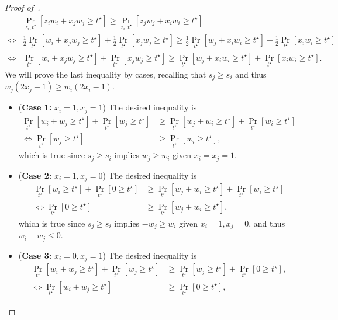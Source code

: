 \begin{proof}[Proof of~]
    \begin{align*}
        &\Pr_{z_i, t^\star}[z_i w_i + x_j w_j \geq t^\star] \geq \Pr_{z_i, t^\star}[z_j w_j + x_i w_i \geq t^\star] \\
        \iff& \frac{1}{2}\Pr_{t^\star}[w_i + x_j w_j \geq t^\star] + \frac{1}{2}\Pr_{t^\star}[x_j w_j \geq t^\star] \geq \frac{1}{2}\Pr_{t^\star}[w_j + x_i w_i \geq t^\star] + \frac{1}{2}\Pr_{t^\star}[x_i w_i \geq t^\star] \\
        \iff& \Pr_{t^\star}[w_i + x_j w_j \geq t^\star] + \Pr_{t^\star}[x_j w_j \geq t^\star] \geq \Pr_{t^\star}[w_j + x_i w_i \geq t^\star] + \Pr_{t^\star}[x_i w_i \geq t^\star].
    \end{align*}
    We will prove the last inequality by cases, recalling that $s_j \geq s_i$ and thus $w_j (2x_j - 1) \geq w_i (2x_i - 1)$.
    \begin{itemize}
        \item (\textbf{Case 1:} $x_i = 1, x_j = 1$) The desired inequality is
        \begin{align*}
            \Pr_{t^\star}[w_i + w_j \geq t^\star] + \Pr_{t^\star}[w_j \geq t^\star] &\geq \Pr_{t^\star}[w_j + w_i \geq t^\star] + \Pr_{t^\star}[w_i \geq t^\star]\\
            \iff \Pr_{t^\star}[w_j \geq t^\star] &\geq \Pr_{t^\star}[w_i \geq t^\star],
        \end{align*}
        which is true since $s_j \geq s_i$ implies $w_j \geq w_i$ given $x_i = x_j = 1$.
        \item (\textbf{Case 2:} $x_i = 1, x_j = 0$) The desired inequality is
        \begin{align*}
            \Pr_{t^\star}[w_i \geq t^\star] + \Pr_{t^\star}[0\geq t^\star] &\geq \Pr_{t^\star}[w_j + w_i \geq t^\star] + \Pr_{t^\star}[w_i \geq t^\star]\\
            \iff \Pr_{t^\star}[0 \geq t^\star] &\geq \Pr_{t^\star}[w_j + w_i \geq t^\star],
        \end{align*}
        which is true since $s_j \geq s_i$ implies $-w_j \geq w_i$ given $x_i = 1, x_j = 0$, and thus $w_i + w_j \leq 0$.
        \item (\textbf{Case 3:} $x_i = 0, x_j = 1$) The desired inequality is 
        \begin{align*}
            \Pr_{t^\star}[w_i + w_j \geq t^\star] + \Pr_{t^\star}[w_j \geq t^\star] &\geq \Pr_{t^\star}[w_j \geq t^\star] + \Pr_{t^\star}[0 \geq t^\star],\\
            \iff \Pr_{t^\star}[w_i + w_j \geq t^\star] &\geq \Pr_{t^\star}[0\geq t^\star],

\end{align*}
\end{itemize}
\end{proof}
